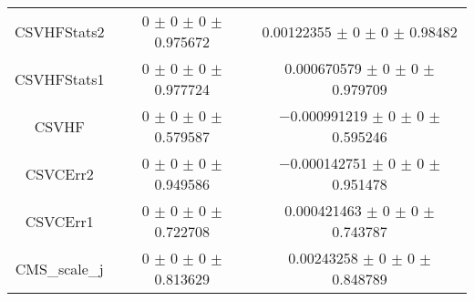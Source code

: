 \begin{table}
\begin{tabular}{ccc}
CSVHFStats2 & \num{0} $\pm$ \num{0} $\pm$ \num{0} $\pm$ \num{0.975672} & \num{0.00122355} $\pm$ \num{0} $\pm$ \num{0} $\pm$ \num{0.98482}\\
CSVHFStats1 & \num{0} $\pm$ \num{0} $\pm$ \num{0} $\pm$ \num{0.977724} & \num{0.000670579} $\pm$ \num{0} $\pm$ \num{0} $\pm$ \num{0.979709}\\
CSVHF & \num{0} $\pm$ \num{0} $\pm$ \num{0} $\pm$ \num{0.579587} & \num{-0.000991219} $\pm$ \num{0} $\pm$ \num{0} $\pm$ \num{0.595246}\\
CSVCErr2 & \num{0} $\pm$ \num{0} $\pm$ \num{0} $\pm$ \num{0.949586} & \num{-0.000142751} $\pm$ \num{0} $\pm$ \num{0} $\pm$ \num{0.951478}\\
CSVCErr1 & \num{0} $\pm$ \num{0} $\pm$ \num{0} $\pm$ \num{0.722708} & \num{0.000421463} $\pm$ \num{0} $\pm$ \num{0} $\pm$ \num{0.743787}\\
CMS\_scale\_j & \num{0} $\pm$ \num{0} $\pm$ \num{0} $\pm$ \num{0.813629} & \num{0.00243258} $\pm$ \num{0} $\pm$ \num{0} $\pm$ \num{0.848789}\\
\bottomrule
\end{tabular}
\end{table}